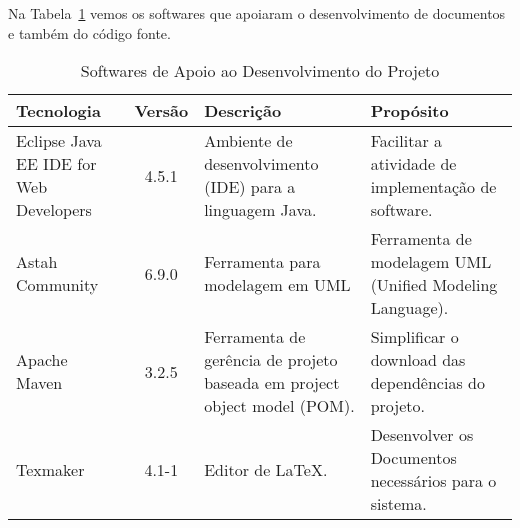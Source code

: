 
\newpage
Na Tabela~\ref{tabela-software} vemos os softwares que apoiaram o desenvolvimento de documentos e também do código fonte.

\begin{table}[h]
	\centering	
	\vspace{0.5cm}
	\begin{tabular}{|p{3cm}|c|p{5cm}|p{6cm}|}  \hline \rowcolor[rgb]{0.8,0.8,0.8}
	
 		Tecnologia & Versão & Descrição & Propósito \\\hline 
 		 
		Eclipse Java EE IDE for Web Developers  & 4.5.1 & Ambiente de desenvolvimento (IDE) para a linguagem Java.  &	Facilitar a atividade de implementação de software.	  \\\hline 
 		                            
		Astah Community & 6.9.0 & Ferramenta para modelagem em UML & Ferramenta de modelagem UML (Unified Modeling Language). \\\hline
			              
		Apache Maven    & 3.2.5 & Ferramenta de gerência de projeto baseada em project object model (POM).  &  Simplificar o download das dependências do projeto.  \\\hline 
		
		Texmaker   & 4.1-1 &  Editor de LaTeX.  &  Desenvolver os Documentos necessários para o sistema.  \\\hline       
			              
	\end{tabular}
	\caption{Softwares de Apoio ao Desenvolvimento do Projeto}	
	\label{tabela-software}
\end{table}

